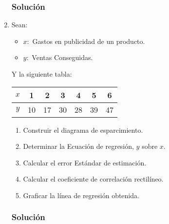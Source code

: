 \begin{enumerate}
\subsubsection{Solución}
\item Sean:
\begin{itemize}
\item $x:$ Gastos en publicidad de un producto.
\item $y:$ Ventas Conseguidas.
\end{itemize}
Y la siguiente tabla:
\begin{center}
\begin{tabular}{|c|c|c|c|c|c|c|}
\hline 
$x$ & 1 & 2 & 3 & 4 & 5 & 6 \\ 
\hline 
$y$ & 10 & 17 & 30 & 28 & 39 & 47 \\ 
\hline 
\end{tabular} 
\end{center}
\begin{enumerate}
\item Construir el diagrama de esparcimiento.
\item Determinar la Ecuación de regresión, $y$ sobre $x$.
\item Calcular el error Estándar de estimación.
\item Calcular el coeficiente de correlación rectilíneo.
\item Graficar la línea de regresión obtenida.
\end{enumerate}
\subsubsection{Solución}
\end{enumerate}
